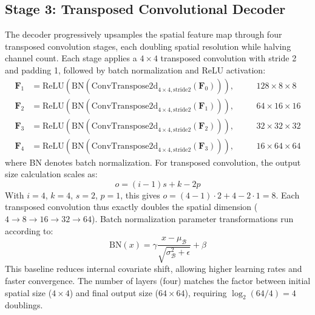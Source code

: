 \documentclass[12pt,a4paper,oneside]{report}
\begin{document}
\subsection{Stage 3: Transposed Convolutional Decoder}
The decoder progressively upsamples the spatial feature map through four transposed convolution stages, each doubling spatial resolution while halving channel count. Each stage applies a $4 \times 4$ transposed convolution with stride 2 and padding 1, followed by batch normalization and ReLU activation:
\begin{align}
\mathbf{F}_1 &= \text{ReLU}(\text{BN}(\text{ConvTranspose2d}_{4\times4,\text{stride}2}(\mathbf{F}_0))), &\quad &128 \times 8 \times 8 \\
\mathbf{F}_2 &= \text{ReLU}(\text{BN}(\text{ConvTranspose2d}_{4\times4,\text{stride}2}(\mathbf{F}_1))), &\quad &64 \times 16 \times 16 \\
\mathbf{F}_3 &= \text{ReLU}(\text{BN}(\text{ConvTranspose2d}_{4\times4,\text{stride}2}(\mathbf{F}_2))), &\quad &32 \times 32 \times 32 \\
\mathbf{F}_4 &= \text{ReLU}(\text{BN}(\text{ConvTranspose2d}_{4\times4,\text{stride}2}(\mathbf{F}_3))), &\quad &16 \times 64 \times 64
\end{align}
where BN denotes batch normalization. For transposed convolution, the output size calculation scales as:
\begin{equation}
o = (i - 1)s + k - 2p
\end{equation}
With $i=4$, $k=4$, $s=2$, $p=1$, this gives $o = (4 - 1)\cdot 2 + 4 - 2\cdot 1 = 8$. Each transposed convolution thus exactly doubles the spatial dimension ($4 \rightarrow 8 \rightarrow 16 \rightarrow 32 \rightarrow 64$). Batch normalization parameter transformations run according to:
\begin{equation}
\text{BN}(x) = \gamma \frac{x - \mu_{\mathcal{B}}}{\sqrt{\sigma_{\mathcal{B}}^2 + \epsilon}} + \beta
\end{equation}
This baseline reduces internal covariate shift, allowing higher learning rates and faster convergence. The number of layers (four) matches the factor between initial spatial size ($4 \times 4$) and final output size ($64 \times 64$), requiring $\log_2(64/4) = 4$ doublings.
\end{document}
